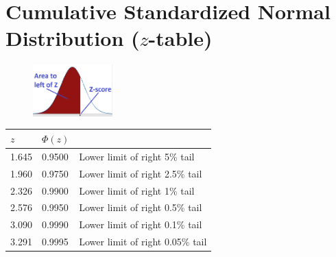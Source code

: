 \section{Cumulative Standardized Normal Distribution ($z$-table)}

\changefontsizes{7pt}

\renewcommand{\arraystretch}{1.3}
\begin{table}[H]
    \begin{minipage}{0.49\linewidth}
        \begin{figure}[H]
            \centering
            \includegraphics[width=\linewidth, height=2cm, keepaspectratio]{Pictures/distributions/z-table_graph.jpg}
        \end{figure}
    \end{minipage}
    \hfill
    \begin{minipage}{0.49\linewidth}
        \begin{table}[H]
            \centering
            \begin{tabular}{ l l l }
                \hline
                \rowcolor{gray!30}
                $z$     & $\Phi(z)$ & \\ \hline
                1.645   & 0.9500    & Lower limit of right 5\% tail \\
                1.960   & 0.9750    & Lower limit of right 2.5\% tail \\
                2.326   & 0.9900    & Lower limit of right 1\% tail \\
                2.576   & 0.9950    & Lower limit of right 0.5\% tail \\
                3.090   & 0.9990    & Lower limit of right 0.1\% tail \\
                3.291   & 0.9995    & Lower limit of right 0.05\% tail \\ 
                \hline
            \end{tabular}
        \end{table}
    \end{minipage}
\end{table}
\renewcommand{\arraystretch}{1}


